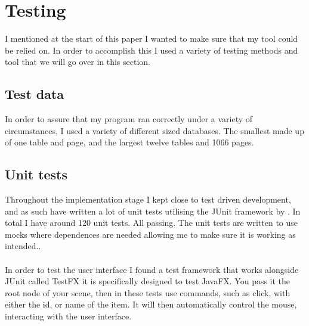 %
%
%
%
%
%

\section{Testing}
\label{sec:testing}

 I mentioned at the start of this paper I wanted to make sure that my tool could be relied on. In order to accomplish this I used a variety of testing methods and tool that we will go over in this section.

\subsection{Test data}
\label{subsec:test_data}

In order to assure that my program ran correctly under a variety of circumstances, I used a variety of different sized databases. The smallest made up of one table and page, and the largest twelve tables and 1066 pages. 

\subsection{Unit tests}
\label{subsec:unit_tests}

Throughout the implementation stage I kept close to test driven development, and as such have written a lot of unit tests utilising the JUnit framework by \cite{junit} . In total I have around 120 unit tests. All passing. The unit tests are written to use mocks where dependences are needed allowing me to make sure it is working as intended..
\\\\
In order to test the user interface I found a test framework that works alongside JUnit called TestFX \citep{test_fx} it is specifically designed to test JavaFX. You pass it the root node of your scene, then in these tests use commands, such as click, with either the id, or name of the item. It will then automatically control the mouse, interacting with the user interface.

